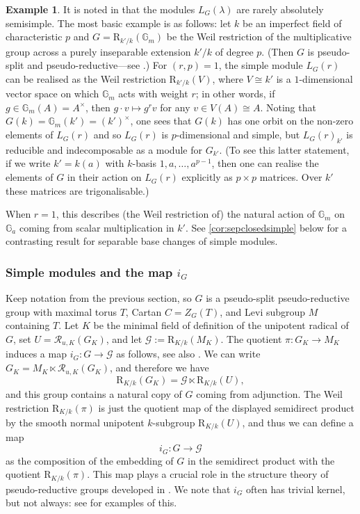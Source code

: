 \documentclass[11pt,reqno]{amsart}
\theoremstyle{definition}
\newtheorem{example}[lemma]{Example}
\theoremstyle{remark}
\theoremstyle{definition}
\theoremstyle{plain}
\newcommand{\R}{\mathrm{R}}
\newcommand{\RR}{\mathscr{R}}
\newcommand{\G}{\mathscr{G}}
\newcommand{\Gm}{\mathbb{G}_m}
\newcommand{\Ga}{\mathbb{G}_a}
\begin{document}
\begin{example}\label{rem:notabs}
It is noted in \cite[Rem 4.7(i)]{BS22} that the modules $L_G(\lambda)$ are rarely absolutely semisimple.
The most basic example is as follows: let $k$ be an imperfect field of characteristic $p$ and $G = \R_{k'/k}(\Gm)$ be the Weil restriction of the multiplicative group
across a purely inseparable extension $k'/k$ of degree $p$. (Then $G$ is pseudo-split and pseudo-reductive---see \cite[1.1.3]{CGP15}.) 
For $(r,p)=1$, the simple module $L_G(r)$ can be realised as the Weil restriction $\R_{k'/k}(V)$, where $V\cong k'$ is a $1$-dimensional vector space on which $\Gm$ acts with weight $r$; in other words, if $g\in \Gm(A)=A^\times$, then $g\cdot v\mapsto g^rv$ for any $v\in V(A)\cong A$.  Noting that $G(k)=\Gm(k')=(k')^\times$, one sees that $G(k)$ has one orbit on the non-zero elements of $L_G(r)$ and so $L_G(r)$ is $p$-dimensional and simple, but $L_G(r)_{k'}$ 
is reducible and indecomposable as a module for $G_{k'}$. 
(To see this latter statement, if we write $k' = k(a)$ with $k$-basis $1,a,\ldots,a^{p-1}$, then one can realise the elements of $G$ in their action on $L_G(r)$ explicitly as 
$p\times p$ matrices. Over $k'$ these matrices are trigonalisable.)

When $r=1$, this describes (the Weil restriction of) the natural action of $\Gm$ on $\Ga$ coming from scalar multiplication in $k'$.
See \cref{cor:sepclosedsimple} below for a contrasting result for separable base changes of simple modules.
\end{example}


\subsubsection{Simple modules and the map \texorpdfstring{$i_G$}{iG}}\label{sec:i_G}
Keep notation from the previous section, so $G$ is a pseudo-split pseudo-reductive group with maximal torus $T$, Cartan $C = Z_G(T)$, and Levi subgroup $M$ containing $T$.
Let $K$ be the minimal field of definition of the unipotent radical of $G$, set $U = \RR_{u,K}(G_{K})$, and let $\G:= \R_{K/k}(M_{K})$.
The quotient $\pi:G_{K} \to M_{K}$ induces a map $i_G:G \to \G$ as follows, see also \cite[Eq. (1.3.1)]{CGP15}.
We can write $G_{K} = M_{K}\ltimes \RR_{u,K}(G_{K})$, and therefore we have 
$$
\R_{K/k}(G_{K}) = \G\ltimes \R_{K/k}(U),
$$
and this group contains a natural copy of $G$ coming from adjunction.
The Weil restriction $\R_{K/k}(\pi)$ is just the quotient map of the displayed semidirect product by the smooth normal 
unipotent $k$-subgroup $\R_{K/k}(U)$, and thus we can define a map 
\begin{equation}\label{eq:i_G}
i_G:G \to \G
\end{equation} 
as the composition of the embedding of $G$ in the semidirect product with the quotient $\R_{K/k}(\pi)$.
This map plays a crucial role in the structure theory of pseudo-reductive groups developed in \cite{CGP15}.
We note that $i_G$ often has trivial kernel, but not always: see \cite[Ex. 1.6.3, Ex. 5.3.7]{CGP15} for examples of this.
\end{document}
